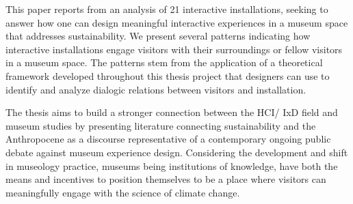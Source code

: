 This paper reports from an analysis of 21 interactive installations, seeking to answer how one can design meaningful interactive experiences in a museum space that addresses sustainability. We present several patterns indicating how interactive installations engage visitors with their surroundings or fellow visitors in a museum space. The patterns stem from the application of a theoretical framework developed throughout this thesis project that designers can use to identify and analyze dialogic relations between visitors and installation.

The thesis aims to build a stronger connection between the HCI/ IxD field and museum studies by presenting literature connecting sustainability and the Anthropocene as a discourse representative of a contemporary ongoing public debate against museum experience design. Considering the development and shift in museology practice, museums being institutions of knowledge, have both the means and incentives to position themselves to be a place where visitors can meaningfully engage with the science of climate change.